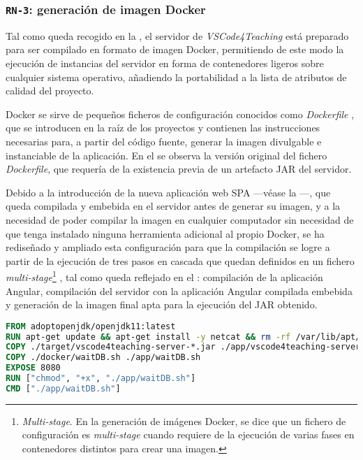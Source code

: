 \subsubsection{\texttt{RN-3}: generación de imagen Docker}
\label{subsec:rn3}

Tal como queda recogido en la , el servidor de \textit{VSCode4Teaching} está preparado para ser compilado en formato de imagen Docker, permitiendo de este modo la ejecución de instancias del servidor en forma de contenedores ligeros sobre cualquier sistema operativo, añadiendo la portabilidad a la lista de atributos de calidad del proyecto.

Docker se sirve de pequeños ficheros de configuración conocidos como \textit{Dockerfile} \cite{rn3_dockerfile}, que se introducen en la raíz de los proyectos y contienen las instrucciones necesarias para, a partir del código fuente, generar la imagen divulgable e instanciable de la aplicación. En el  se observa la versión original del fichero \textit{Dockerfile}, que requería de la existencia previa de un artefacto JAR del servidor.

Debido a la introducción de la nueva aplicación web SPA ---véase la ---, que queda compilada y embebida en el servidor antes de generar su imagen, y a la necesidad de poder compilar la imagen en cualquier computador sin necesidad de que tenga instalado ninguna herramienta adicional al propio Docker, se ha rediseñado y ampliado esta configuración para que la compilación se logre a partir de la ejecución de tres pasos en cascada que quedan definidos en un fichero \textit{multi-stage}\footnote{\textit{Multi-stage}. En la generación de imágenes Docker, se dice que un fichero de configuración es \textit{multi-stage} cuando requiere de la ejecución de varias fases en contenedores distintos para crear una imagen.} \cite{rn3_multistage}, tal como queda reflejado en el : compilación de la aplicación Angular, compilación del servidor con la aplicación Angular compilada embebida y generación de la imagen final apta para la ejecución del JAR obtenido.

\begin{lstlisting}[language=Dockerfile,caption={\textit{Dockerfile} original del proyecto.},label=cod:dockerfileAnterior]
FROM adoptopenjdk/openjdk11:latest
RUN apt-get update && apt-get install -y netcat && rm -rf /var/lib/apt/lists/*
COPY ./target/vscode4teaching-server-*.jar ./app/vscode4teaching-server-*.jar
COPY ./docker/waitDB.sh ./app/waitDB.sh
EXPOSE 8080
RUN ["chmod", "+x", "./app/waitDB.sh"]
CMD ["./app/waitDB.sh"]
\end{lstlisting}

